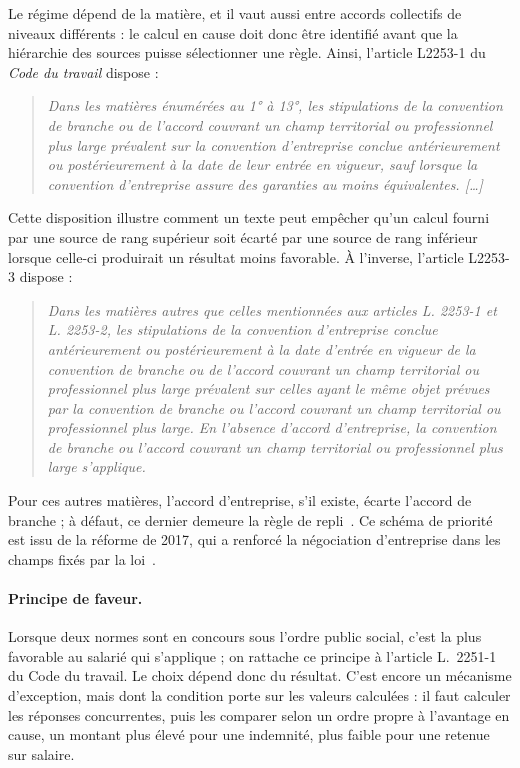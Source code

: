 \documentclass[review]{jflart}
\begin{document}
Le régime dépend de la matière, et il vaut aussi entre accords collectifs de
niveaux différents : le calcul en cause doit donc être identifié avant que la
hiérarchie des sources puisse sélectionner une règle. Ainsi, l'article L2253-1
du \emph{Code du travail} dispose :
\begin{quote}\itshape
  Dans les matières énumérées au 1° à 13°, les stipulations de la convention de
  branche ou de l'accord couvrant un champ territorial ou professionnel plus
  large prévalent sur la convention d'entreprise conclue antérieurement ou
  postérieurement à la date de leur entrée en vigueur, sauf lorsque la
  convention d'entreprise assure des garanties au moins équivalentes. [\dots]
\end{quote}
Cette disposition illustre comment un texte peut empêcher qu'un calcul fourni
par une source de rang supérieur soit écarté par une source de rang inférieur
lorsque celle-ci produirait un résultat moins favorable. À l'inverse,
l'article L2253-3 dispose :
\begin{quote}\itshape
  Dans les matières autres que celles mentionnées aux articles L. 2253-1 et
  L. 2253-2, les stipulations de la convention d'entreprise conclue
  antérieurement ou postérieurement à la date d'entrée en vigueur de la
  convention de branche ou de l'accord couvrant un champ territorial ou
  professionnel plus large prévalent sur celles ayant le même objet prévues par
  la convention de branche ou l'accord couvrant un champ territorial ou
  professionnel plus large. En l'absence d'accord d'entreprise, la convention
  de branche ou l'accord couvrant un champ territorial ou professionnel plus
  large s'applique.
\end{quote}
Pour ces autres matières, l'accord d'entreprise, s'il existe, écarte l'accord
de branche ; à défaut, ce dernier demeure la règle de repli~\cite{frarticulation}.
Ce schéma de priorité est issu de la réforme de 2017, qui a renforcé la
négociation d'entreprise dans les champs fixés par la
loi~\cite{viepublique2017}.
\paragraph{Principe de faveur.} Lorsque deux normes sont en concours sous
  l'ordre public social, c'est la plus favorable au salarié qui s'applique ;
  on rattache ce principe à l'article L.~2251-1 du Code du travail. Le choix
  dépend donc du résultat. C'est encore un mécanisme d'exception, mais dont la
  condition porte sur les valeurs calculées : il faut calculer les réponses
  concurrentes, puis les comparer selon un ordre propre à l'avantage en cause, un montant plus élevé
  pour une indemnité, plus faible pour une retenue sur salaire.
\end{document}

